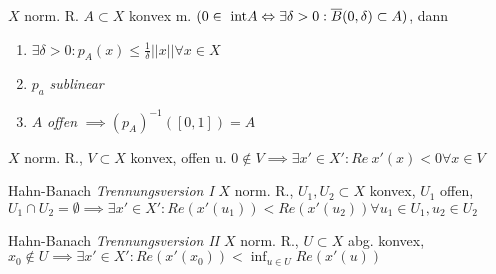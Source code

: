 \begin{lemma}
  $X$ norm. R. $A \subset X$ konvex m. $(0 \in \text{ int} A \Leftrightarrow
  \exists \delta > 0: \overline{B}(0,\delta) \subset A)$, dann
  \begin{enumerate}[label = (\roman*)]
    \item $\exists \delta >0: p_A(x) \leq \frac{1}{\delta} ||x|| \forall x\in X$
    \item $p_a$ \textit{sublinear}
    \item $A$ \textit{offen} $\implies (p_A)^{-1}([0,1]) = A$
  \end{enumerate}
\end{lemma}

\begin{lemma}
  $X$ norm. R., $V \subset X$ konvex, offen u. $0 \not\in V \implies \exists
  x' \in X': Re\ x'(x) <0 \forall x \in V$
\end{lemma}

\begin{satz}{Hahn-Banach \textit{Trennungsversion I}}
  $X$ norm. R., $U_1, U_2 \subset X$ konvex, $U_1$ offen,
  $U_1 \cap U_2 = \emptyset \implies \exists x' \in X':
  Re(x'(u_1))<Re(x'(u_2)) \forall u_1\in U_1,u_2\in U_2$
\end{satz}

\begin{satz}{Hahn-Banach \textit{Trennungsversion II}}
  $X$ norm. R., $U \subset X$ abg. konvex, $x_0 \not\in U \implies
  \exists x' \in X': Re(x'(x_0)) < \inf_{u\in U}Re(x'(u))$
\end{satz}

